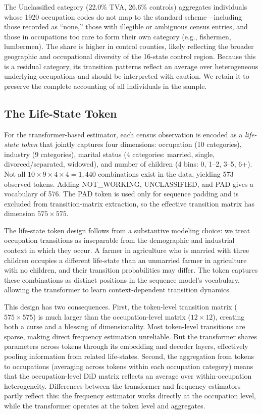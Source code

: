 \documentclass[12pt]{article}
\begin{document}
The Unclassified category (22.0\% TVA, 26.6\% controls) aggregates individuals whose 1920 occupation codes do not map to the standard scheme---including those recorded as ``none,'' those with illegible or ambiguous census entries, and those in occupations too rare to form their own category (e.g., fishermen, lumbermen). The share is higher in control counties, likely reflecting the broader geographic and occupational diversity of the 16-state control region. Because this is a residual category, its transition patterns reflect an average over heterogeneous underlying occupations and should be interpreted with caution. We retain it to preserve the complete accounting of all individuals in the sample.

\subsection{The Life-State Token}

For the transformer-based estimator, each census observation is encoded as a \textit{life-state token} that jointly captures four dimensions: occupation (10 categories), industry (9 categories), marital status (4 categories: married, single, divorced/separated, widowed), and number of children (4 bins: 0, 1--2, 3--5, 6+). Not all $10 \times 9 \times 4 \times 4 = 1{,}440$ combinations exist in the data, yielding 573 observed tokens. Adding NOT\_WORKING, UNCLASSIFIED, and PAD gives a vocabulary of 576. The PAD token is used only for sequence padding and is excluded from transition-matrix extraction, so the effective transition matrix has dimension $575 \times 575$.

The life-state token design follows from a substantive modeling choice: we treat occupation transitions as inseparable from the demographic and industrial context in which they occur. A farmer in agriculture who is married with three children occupies a different life-state than an unmarried farmer in agriculture with no children, and their transition probabilities may differ. The token captures these combinations as distinct positions in the sequence model's vocabulary, allowing the transformer to learn context-dependent transition dynamics.

This design has two consequences. First, the token-level transition matrix ($575 \times 575$) is much larger than the occupation-level matrix ($12 \times 12$), creating both a curse and a blessing of dimensionality. Most token-level transitions are sparse, making direct frequency estimation unreliable. But the transformer shares parameters across tokens through its embedding and decoder layers, effectively pooling information from related life-states. Second, the aggregation from tokens to occupations (averaging across tokens within each occupation category) means that the occupation-level DiD matrix reflects an average over within-occupation heterogeneity. Differences between the transformer and frequency estimators partly reflect this: the frequency estimator works directly at the occupation level, while the transformer operates at the token level and aggregates.
\end{document}
